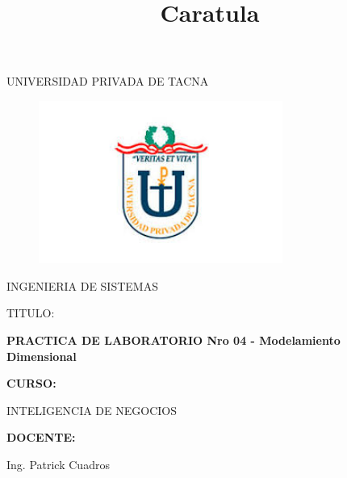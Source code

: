 \documentclass[12pt,letterpaper]{article}
\title{Caratula}
\begin{document}
\begin{titlepage}
\begin{center}
\large{UNIVERSIDAD PRIVADA DE TACNA}\\
\vspace*{-0.025in}
\begin{figure}[htb]
\begin{center}
\includegraphics[width=8cm]{./IMG/logo}
\end{center}
\end{figure}
\vspace*{0.15in}
INGENIERIA DE SISTEMAS  \\

\vspace*{0.5in}
\begin{large}
TITULO:\\
\end{large}

\vspace*{0.1in}
\begin{Large}
\textbf{PRACTICA DE LABORATORIO Nro 04 - Modelamiento Dimensional} \\
\end{Large}

\vspace*{0.3in}
\begin{Large}
\textbf{CURSO:} \\
\end{Large}

\vspace*{0.1in}
\begin{large}
INTELIGENCIA DE NEGOCIOS\\
\end{large}

\vspace*{0.3in}
\begin{Large}
\textbf{DOCENTE:} \\
\end{Large}

\vspace*{0.1in}
\begin{large}
 Ing. Patrick Cuadros\\
\end{large}


\end{center}
\end{titlepage}
\end{document}
